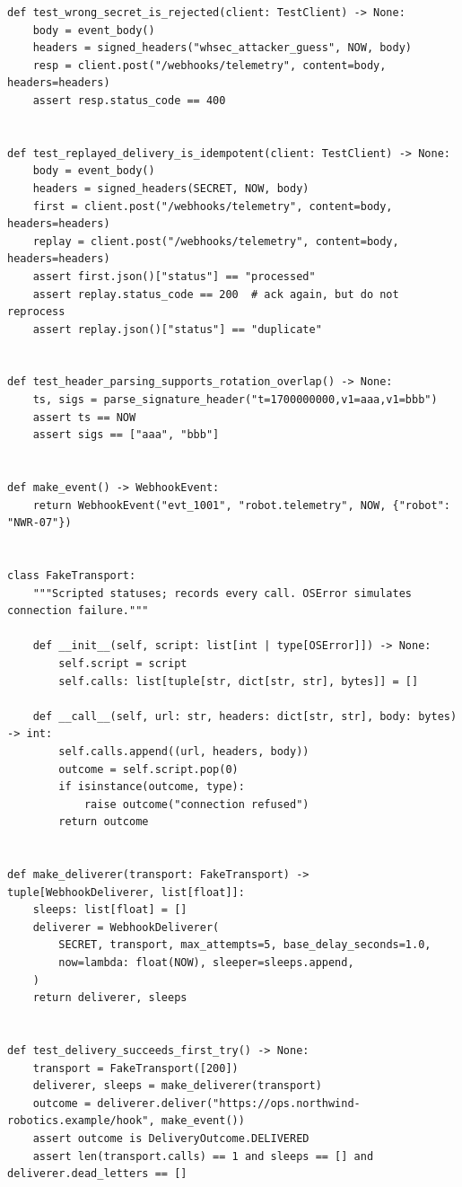 \begin{verbatim}
def test_wrong_secret_is_rejected(client: TestClient) -> None:
    body = event_body()
    headers = signed_headers("whsec_attacker_guess", NOW, body)
    resp = client.post("/webhooks/telemetry", content=body, headers=headers)
    assert resp.status_code == 400


def test_replayed_delivery_is_idempotent(client: TestClient) -> None:
    body = event_body()
    headers = signed_headers(SECRET, NOW, body)
    first = client.post("/webhooks/telemetry", content=body, headers=headers)
    replay = client.post("/webhooks/telemetry", content=body, headers=headers)
    assert first.json()["status"] == "processed"
    assert replay.status_code == 200  # ack again, but do not reprocess
    assert replay.json()["status"] == "duplicate"


def test_header_parsing_supports_rotation_overlap() -> None:
    ts, sigs = parse_signature_header("t=1700000000,v1=aaa,v1=bbb")
    assert ts == NOW
    assert sigs == ["aaa", "bbb"]


def make_event() -> WebhookEvent:
    return WebhookEvent("evt_1001", "robot.telemetry", NOW, {"robot": "NWR-07"})


class FakeTransport:
    """Scripted statuses; records every call. OSError simulates connection failure."""

    def __init__(self, script: list[int | type[OSError]]) -> None:
        self.script = script
        self.calls: list[tuple[str, dict[str, str], bytes]] = []

    def __call__(self, url: str, headers: dict[str, str], body: bytes) -> int:
        self.calls.append((url, headers, body))
        outcome = self.script.pop(0)
        if isinstance(outcome, type):
            raise outcome("connection refused")
        return outcome


def make_deliverer(transport: FakeTransport) -> tuple[WebhookDeliverer, list[float]]:
    sleeps: list[float] = []
    deliverer = WebhookDeliverer(
        SECRET, transport, max_attempts=5, base_delay_seconds=1.0,
        now=lambda: float(NOW), sleeper=sleeps.append,
    )
    return deliverer, sleeps


def test_delivery_succeeds_first_try() -> None:
    transport = FakeTransport([200])
    deliverer, sleeps = make_deliverer(transport)
    outcome = deliverer.deliver("https://ops.northwind-robotics.example/hook", make_event())
    assert outcome is DeliveryOutcome.DELIVERED
    assert len(transport.calls) == 1 and sleeps == [] and deliverer.dead_letters == []



\end{verbatim}
